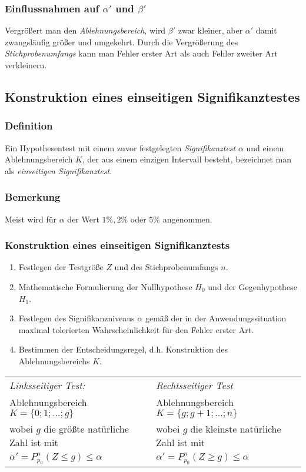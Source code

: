 \documentclass[a4paper,12pt]{article}
\begin{document}
\subsubsection{Einflussnahmen auf $\alpha'$ und $\beta'$}
Vergrößert man den \emph{Ablehnungsbereich}, wird $\beta'$ zwar kleiner, aber $\alpha'$ damit zwangsläufig größer und umgekehrt. 
Durch die Vergrößerung des \emph{Stichprobenumfangs} kann man Fehler erster Art als auch Fehler zweiter Art verkleinern. 

\subsection{Konstruktion eines einseitigen Signifikanztestes}
\subsubsection{Definition}
Ein Hypothesentest mit einem zuvor festgelegten \emph{Signifikanztest} $\alpha$ und einem Ablehnungsbereich $K$, der aus einem einzigen Intervall besteht, bezeichnet man als \emph{einseitigen Signifikanztest}.

\subsubsection{Bemerkung}
Meist wird für $\alpha $ der Wert $1 \%, 2 \%$ oder $5 \%$ angenommen.


\subsubsection{Konstruktion eines einseitigen Signifikanztests}
\begin{enumerate}[(1)]
\item Festlegen der Testgröße $Z$ und des Stichprobenumfangs $n$.
\item Mathematische Formulierung der Nullhypothese $H_0$ und der Gegenhypothese $H_1$.
\item Festlegen des Signifikanzniveaus $\alpha$ gemäß der in der Anwendungssituation maximal tolerierten Wahrscheinlichkeit für den Fehler erster Art.
\item Bestimmen der Entscheidungsregel, d.h. Konstruktion des Ablehnungsbereichs $K$.
\end{enumerate}
\begin{tabularx}{\textwidth}{ |X|X| }
\hline
\emph{Linksseitiger Test:} & \emph{Rechtsseitiger Test} \\
Ablehnungsbereich $K=\{ 0; 1; ...; g \}$ & Ablehnungsbereich $K=\{ g; g+1; ...; n \}$ \\
wobei $g$ die größte natürliche Zahl ist mit & wobei  $g$ die kleinste natürliche Zahl ist mit \\
$\alpha'=P_{p_0}^n(Z\leq g)\leq \alpha$ & $\alpha'=P_{p_0}^n(Z\geq g)\leq \alpha$ \\
\hline
\end{tabularx}
\end{document}
